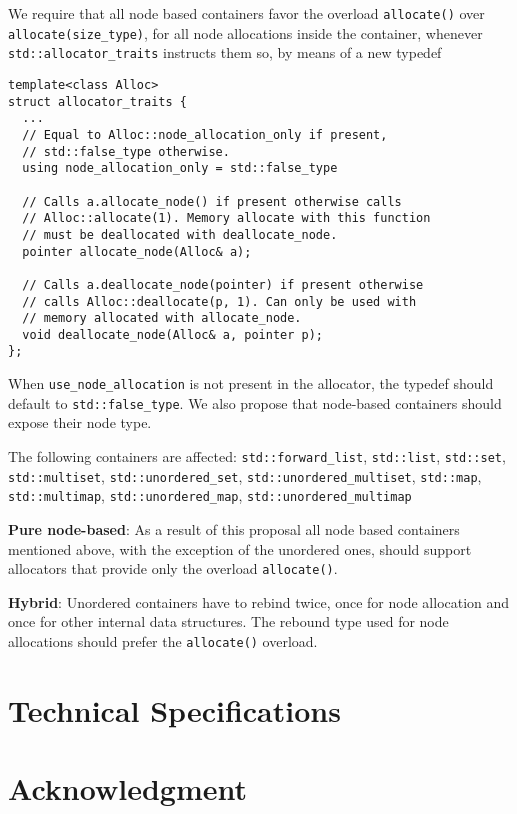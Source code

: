 \documentclass[11pt]{article}
\begin{document}
We require that all node based containers favor the overload
\texttt{allocate()} over \texttt{allocate(size\_type)}, for all node
allocations inside the container, whenever
\texttt{std::allocator\_traits} instructs them so, by means of a new
typedef
\medskip
\begin{lstlisting}
template<class Alloc>
struct allocator_traits {
  ...
  // Equal to Alloc::node_allocation_only if present,
  // std::false_type otherwise.
  using node_allocation_only = std::false_type

  // Calls a.allocate_node() if present otherwise calls
  // Alloc::allocate(1). Memory allocate with this function
  // must be deallocated with deallocate_node.
  pointer allocate_node(Alloc& a);

  // Calls a.deallocate_node(pointer) if present otherwise
  // calls Alloc::deallocate(p, 1). Can only be used with
  // memory allocated with allocate_node.
  void deallocate_node(Alloc& a, pointer p);
};
\end{lstlisting}
When \texttt{use\_node\_allocation} is not present in the allocator,
the typedef should default to \texttt{std::false\_type}.
We also propose that node-based containers should expose their node type.

The following containers are affected: \texttt{std::forward\_list},
\texttt{std::list}, \texttt{std::set}, \texttt{std::multiset},
\texttt{std::unordered\_set}, \texttt{std::unordered\_multiset},
\texttt{std::map}, \texttt{std::multimap},
\texttt{std::unordered\_map}, \texttt{std::unordered\_multimap}

\medskip
\noindent
{\bf Pure node-based}: As a result of this proposal all node based
containers mentioned above, with the exception of the unordered ones,
should support allocators that provide only the overload
\texttt{allocate()}.

\medskip
\noindent
{\bf Hybrid}: Unordered containers have to rebind twice, once
for node allocation and once for other internal data structures.
The rebound type used for node allocations should prefer the 
\texttt{allocate()} overload.

\section{Technical Specifications}

\section{Acknowledgment}
\end{document}
